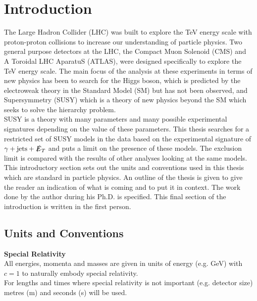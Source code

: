 \chapter{Introduction}

The Large Hadron Collider (LHC) was built to explore the TeV energy scale with
proton-proton collisions to increase our understanding of particle physics. Two 
general purpose detectors at the LHC, the Compact Muon Solenoid (CMS) and A 
Toroidal LHC AparatuS (ATLAS), were designed specifically to explore the TeV 
energy scale. The main focus of the analysis at these experiments in terms of 
new physics has been to search for the Higgs boson, which is predicted by the 
electroweak theory in the Standard Model (SM) but has not been observed, and 
Supersymmetry (SUSY) which is a theory of new physics beyond the SM which seeks 
to solve the hierarchy problem. \\

SUSY is a theory with many parameters and many possible experimental signatures
depending on the value of these parameters. This thesis searches for a 
restricted set of SUSY models in the data based on the experimental signature of 
$\gamma + \mbox{jets} + \slashed{E}_{T}$ and puts a limit on the presence of these models. 
The exclusion limit is compared with the results of other analyses looking at 
the same models. \\ 

This introductory section sets out the units and conventions used in this thesis 
which are standard in particle physics. An outline of the thesis is given to 
give the reader an indication of what is coming and to put it in context. The 
work done by the author during his Ph.D. is specified. This final section of the
introduction is written in the first person.

\section{Units and Conventions}

{\bf Special Relativity} \\

All energies, momenta and masses are given in units of energy (e.g. GeV) with
$c=1$ to naturally embody special relativity. \\

For lengths and times where special relativity is not important (e.g. detector
size) metres (m) and seconds (s) will be used. \\

